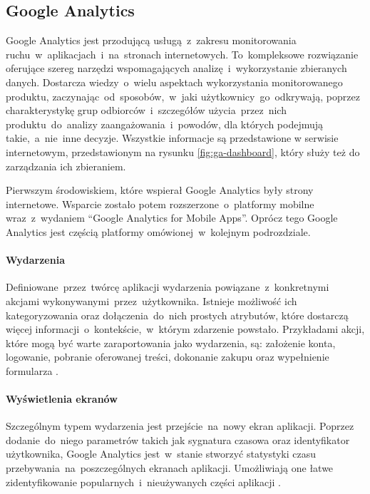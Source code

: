 \subsection{Google Analytics}
\label{sec:ga}
Google Analytics jest przodującą usługą~z~zakresu monitorowania ruchu~w~aplikacjach~i~na~stronach internetowych. To~kompleksowe rozwiązanie oferujące szereg narzędzi wspomagających analizę~i~wykorzystanie zbieranych danych. Dostarcza wiedzy~o~wielu aspektach wykorzystania monitorowanego produktu, zaczynając~od~sposobów,~w~jaki użytkownicy~go~odkrywają, poprzez charakterystykę grup odbiorców~i~szczegółów użycia~przez~nich produktu~do~analizy zaangażowania~i~powodów, dla których podejmują takie,~a~nie~inne decyzje. Wszystkie informacje są przedstawione w serwisie internetowym, przedstawionym na rysunku \ref{fig:ga-dashboard}, który służy też do zarządzania ich zbieraniem.

Pierwszym środowiskiem, które wspierał Google Analytics były strony internetowe. Wsparcie zostało potem rozszerzone~o~platformy mobilne wraz~z~wydaniem ``Google Analytics for Mobile Apps''. Oprócz tego Google Analytics jest częścią platformy  omówionej~w~kolejnym podrozdziale.

\bigskip
{}

\paragraph{Wydarzenia}
\label{par:ga-events}
Definiowane~przez~twórcę aplikacji wydarzenia powiązane~z~konkretnymi akcjami wykonywanymi~przez~użytkownika. Istnieje możliwość ich kategoryzowania oraz dołączenia~do~nich prostych atrybutów, które dostarczą więcej informacji~o~kontekście,~w~którym zdarzenie powstało. Przykładami akcji, które mogą być warte zaraportowania jako wydarzenia, są: założenie konta, logowanie, pobranie oferowanej treści, dokonanie zakupu oraz wypełnienie formularza \cite{GA_Events}.

\paragraph{Wyświetlenia ekranów}
Szczególnym typem wydarzenia jest przejście~na~nowy ekran aplikacji. Poprzez dodanie~do~niego parametrów takich jak sygnatura czasowa oraz identyfikator użytkownika, Google Analytics jest~w~stanie stworzyć statystyki czasu przebywania~na~poszczególnych ekranach aplikacji. Umożliwiają one łatwe zidentyfikowanie popularnych~i~nieużywanych części aplikacji \cite{GA_Pages}.

